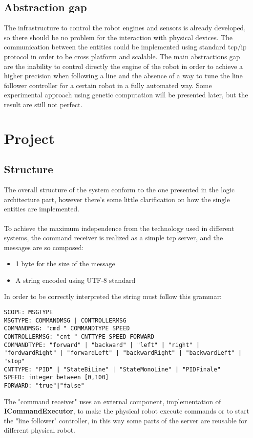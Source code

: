 \documentclass{llncs}
\newcommand{\labelsec}[1]{\label{sec:#1}}
\begin{document}
\subsection{Abstraction gap}
The infrastructure to control the robot engines and sensors is already developed, so there should be no problem for the interaction with physical devices. The communication between the entities could be implemented using standard tcp/ip protocol in order to be cross platform and scalable. The main abstractions gap are the inability to control directly the engine of the robot in order to achieve a higher precision when following a line and the absence of a way to tune the line follower controller for a certain robot in a fully automated way. Some experimental approach using genetic computation will be presented later, but the result are still not perfect.    

\newpage
\section{Project}
\labelsec{Project}

\subsection{Structure}
The overall structure of the system conform to the one presented in the logic architecture part, however there's some little clarification on how the single entities are implemented.\\

\\
To achieve the maximum independence from the technology used in different systems, the command receiver is realized as a simple tcp server, and the messages are so composed:
\begin{itemize}
	\item 1 byte for the size of the message
	\item A string encoded using UTF-8 standard
\end{itemize} 
In order to be correctly interpreted the string must follow this grammar:
\lstset{language=Java}
\begin{lstlisting}
SCOPE: MSGTYPE
MSGTYPE: COMMANDMSG | CONTROLLERMSG
COMMANDMSG: "cmd " COMMANDTYPE SPEED
CONTROLLERMSG: "cnt " CNTTYPE SPEED FORWARD
COMMANDTYPE: "forward" | "backward" | "left" | "right" | "fordwardRight" | "forwardLeft" | "backwardRight" | "backwardLeft" | "stop"
CNTTYPE: "PID" | "StateBiLine" | "StateMonoLine" | "PIDFinale"
SPEED: integer between [0,100]
FORWARD: "true"|"false"
\end{lstlisting}
The "command receiver" uses an external component, implementation of \textbf{ICommandExecutor}, to make the physical robot execute commands or to start the "line follower" controller, in this way some parts of the server are reusable for different physical robot.\\
\end{document}
